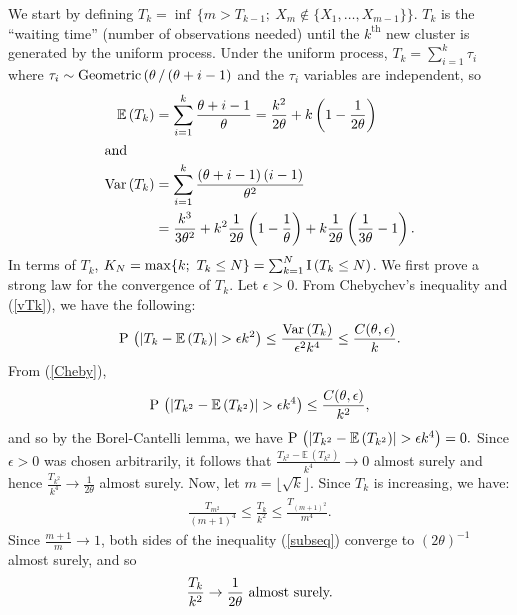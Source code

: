 \documentclass[twoside]{article}
\begin{document}
We start by defining $T_k = \inf\, \{ m > T_{k-1} ;\ X_m \notin \{X_1,
\ldots, X_{m-1} \}\}$.  $T_k$ is the ``waiting time'' (number of
observations needed) until the $k^{\textrm{th}}$ new cluster is
generated by the uniform process.  Under the uniform process, $T_k =
\sum_{i=1}^k \tau_i$ where $\tau_i \sim {\rm Geometric}\,
(\theta\,/\,(\theta + i - 1)$ and the $\tau_i$ variables are
independent, so
\begin{align}
\mathbb{E}\, (T_k) &= \sum\limits_{i=1}^k \frac{\theta + i -
  1}{\theta} = \frac{k^2}{2 \theta} + k \left( 1 - \frac{1}{2 \theta}
\right) \nonumber \\
\intertext{and}
 {\rm Var}\, (T_k) &= \sum\limits_{i=1}^k \frac{(\theta + i - 1)\,(i - 1)}{\theta^2} \label{vTk} \\
 &= \frac{k^3}{3 \theta^2} + k^2 \frac{1}{2\theta} \left( 1 - \frac{1}{\theta} \right) + k \frac{1}{2\theta} \left( \frac{1}{3 \theta} - 1 \right). \nonumber
\end{align}
In terms of $T_k$, $K_N = \max \{ k ;\ T_k \leq N \} = \sum_{k=1}^N
{\rm I}\, (T_k \leq N)$. We first prove a strong law for the
convergence of $T_k$.  Let $\epsilon > 0$.  From Chebychev's
inequality and (\ref{vTk}), we have the following:
\begin{align}
{\rm P}\, \left(|T_k - \mathbb{E}\, (T_k) | > \epsilon  k^2\right) \leq \frac{{\rm Var}\, (T_k) }{\epsilon^2k^4}  \leq \frac{C(\theta,\epsilon)}{k}. \label{Cheby}
\end{align}
From (\ref{Cheby}),
\begin{align*}
{\rm P}\, \left(|T_{k^2} - \mathbb{E}\, (T_{k^2})| > \epsilon k^4 \right) \leq \frac{C(\theta,\epsilon)}{k^2},
\end{align*} 
and so by the Borel-Cantelli lemma, we have ${\rm P}\, \left(|T_{k^2}
- \mathbb{E}\,(T_{k^2})| > \epsilon k^4 \right) = 0.$ Since $\epsilon
> 0$ was chosen arbitrarily, it follows that $\frac{T_{k^2} -
  \mathbb{E}\,(T_{k^2})}{k^4} \to 0$ almost surely and hence
$\frac{T_{k^2}}{k^4} \to \frac{1}{2\theta}$ almost surely. Now, let $m
= \lfloor \sqrt{k} \rfloor$.  Since $T_k$ is increasing, we have:
\begin{align}
\frac{T_{m^2}}{(m + 1)^4} \leq \frac{T_k}{k^2} \leq
\frac{T_{(m + 1)^2}}{m^4}.   \label{subseq}
\end{align}
Since $\frac{m + 1}{m} \to 1$, both sides of the inequality (\ref{subseq}) converge to $(2\theta)^{-1}$ almost surely, and so 
\begin{align}
\frac{T_k}{k^2} \to \frac{1}{2\theta} \hbox{ almost surely.}  \label{strongTk}
\end{align}
\end{document}
